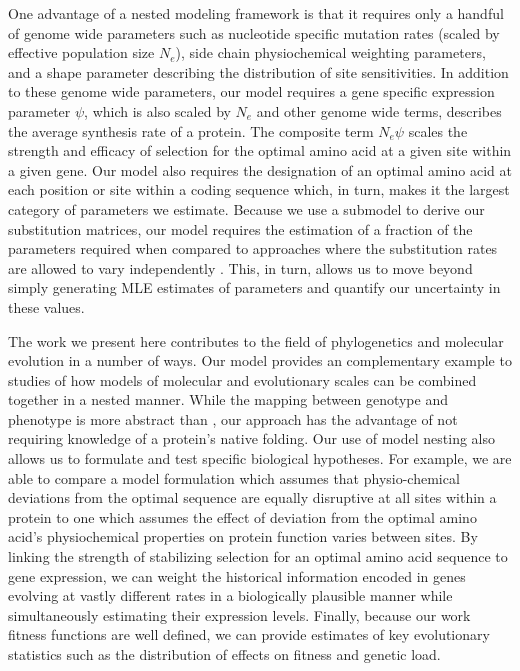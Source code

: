 \documentclass{article}
\newcommand{\Ne}{\ensuremath{{N_e}}\xspace} %
\begin{document}
One advantage of a nested modeling framework is that it requires only a handful of genome wide parameters such as nucleotide specific mutation rates (scaled by effective population size \Ne), side chain physiochemical weighting parameters, and a shape parameter describing the distribution of site sensitivities. %
In addition to these genome wide parameters, our model requires a gene specific expression parameter $\psi$, which is also scaled by $\Ne$ and other genome wide terms, describes the average synthesis rate of a protein.
The composite term $\Ne \psi$ scales the strength and efficacy of selection for the optimal amino acid at a given site within a given gene.
Our model also requires the designation of an optimal amino acid at each position or site within a coding sequence which, in turn, makes it the largest category of parameters we estimate.
Because we use a submodel to derive our substitution matrices, our model requires the estimation of a fraction of the parameters required when compared to approaches where the substitution rates are allowed to vary independently  \citep{HalpernAndBruno1998,LartillotAndPhilippe2004,RodrigueAndLartillot2014}.
This, in turn, allows us to move beyond simply generating MLE estimates of parameters \citep[c.f.][]{YangAndNielsen2008} and quantify our uncertainty in these values.

The work we present here contributes to the field of phylogenetics and molecular evolution in a number of ways.
Our model provides an complementary example to \citet{ThorneEtAl2012} studies of how models of molecular and evolutionary scales can be combined together in a nested manner.
While the mapping between genotype and phenotype is more abstract than \citet{ThorneEtAl2012}, our approach has the advantage of not requiring knowledge of a protein's native folding.
Our use of model nesting also allows us to formulate and test specific biological hypotheses.
For example, we are able to compare a model formulation which assumes that physio-chemical deviations from the optimal sequence are equally disruptive at all sites within a protein to one which assumes the effect of deviation from the optimal amino acid's physiochemical properties on protein function varies between sites.
By linking the strength of stabilizing selection for an optimal amino acid sequence to gene expression,  we can weight the historical information encoded in genes evolving at vastly different rates in a biologically plausible manner while simultaneously estimating their expression levels.
Finally, because our work fitness functions are well defined, we can provide estimates of key evolutionary statistics such as the distribution of effects on fitness and genetic load.
\end{document}
